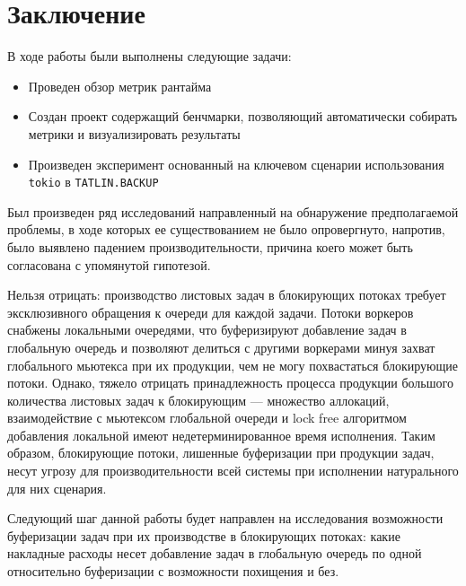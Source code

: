 
\section{Заключение}

В ходе работы были выполнены следующие задачи:

\begin{itemize}
    \item Проведен обзор метрик рантайма
    \item Создан проект содержащий бенчмарки, позволяющий автоматически собирать метрики и визуализировать результаты
    \item Произведен эксперимент основанный на ключевом сценарии использования \verb|tokio| в \verb|TATLIN.BACKUP|
\end{itemize}

Был произведен ряд исследований направленный на обнаружение предполагаемой проблемы, в ходе которых ее существованием не было опровергнуто, напротив, было выявлено падением производительности, причина коего может быть согласована с упомянутой гипотезой.

Нельзя отрицать: производство листовых задач в блокирующих потоках требует эксклюзивного обращения к очереди для каждой задачи. Потоки воркеров снабжены локальными очередями, что буферизируют добавление задач в глобальную очередь и позволяют делиться с другими воркерами минуя захват глобального мьютекса при их продукции, чем не могу похвастаться блокирующие потоки. Однако, тяжело отрицать принадлежность процесса продукции большого количества листовых задач к блокирующим --- множество аллокаций, взаимодействие с мьютексом глобальной очереди и lock free алгоритмом добавления локальной имеют недетерминированное время исполнения. Таким образом, блокирующие потоки, лишенные буферизации при продукции задач, несут угрозу для производительности всей системы при исполнении натурального для них сценария.

Следующий шаг данной работы будет направлен на исследования возможности буферизации задач при их производстве в блокирующих потоках: какие накладные расходы несет добавление задач в глобальную очередь по одной относительно буферизации с возможности похищения и без.
